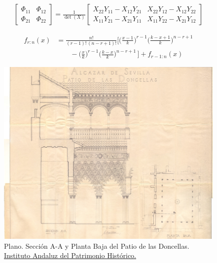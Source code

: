 \lipsum[31-32]
\begin{gather}
    \begin{bmatrix} \Phi_{11} & \Phi_{12} \\ \Phi_{21} & \Phi_{22} \end{bmatrix}
    =
    \frac{1}{\det(X)}
     \begin{bmatrix}
      X_{22} Y_{11} - X_{12} Y_{21} &
      X_{22} Y_{12} - X_{12} Y_{22} \\
      X_{11} Y_{21} - X_{21} Y_{11} &
      X_{11} Y_{22} - X_{21} Y_{12} 
      \end{bmatrix}
   \end{gather}

\lipsum[33-34]
\begin{equation}
    \begin{split}
    f_{r:n}(x)&=\frac{n!}{(r-1)!\,(n-r+1)!}
       \Biggl[ \biggl( \frac{x-1}{k}  \biggr)^{\!r-1} 
               \biggl( \frac{k-x+1}{k}\biggr)^{\!n-r+1} \\
      &\qquad -\biggl( \frac{x}{k}    \biggr)^{\!r-1} 
               \biggl( \frac{k-x}{k}  \biggr)^{\!n-r+1} \,
       \Biggr]+ f_{r-1:n}(x)                    
    \end{split}
\end{equation}


\begin{landscape}
    \begin{figure}[p]
        \centering
        \includegraphics[width=0.69\linewidth]{figures/examples/example5.jpg}
        \caption[Plano. Sección A-A y Planta Baja del Patio de las Doncellas.]{Plano. Sección A-A y Planta Baja del Patio de las Doncellas. \href{https://hdl.handle.net/11532/333959}{Instituto Andaluz del Patrimonio Histórico.}}
        \label{fig:drawing-doncellas}
    \end{figure}
\end{landscape}

\lipsum[45-44]
